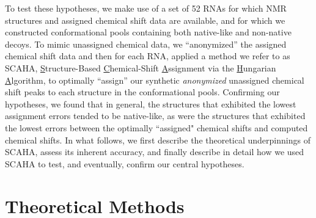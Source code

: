 \documentclass[journal=jcisd8,manuscript=article,layout=onecolumn]{achemso}
\begin{document}
To test these hypotheses, we make use of a set of 52 RNAs for which NMR structures and assigned chemical shift data are available, and for which we constructed conformational pools containing both native-like and non-native decoys. To mimic unassigned chemical data, we ``anonymized'' the assigned chemical shift data and then for each RNA, applied a method we refer to as SCAHA,  \underline{S}tructure-Based \underline{C}hemical-Shift \underline{A}ssignment via the \underline{H}ungarian \underline{A}lgorithm, to optimally ``assign'' our synthetic \textit{anonymized} unassigned chemical shift peaks to each structure in the conformational pools. Confirming our hypotheses, we found that in general,  the structures that exhibited the lowest assignment errors tended to be native-like, as were the structures that exhibited the lowest errors between the optimally ``assigned" chemical shifts and computed chemical shifts. In what follows, we first describe the theoretical underpinnings of SCAHA, assess its inherent accuracy,  and finally describe in detail how we used SCAHA to test, and eventually, confirm our central hypotheses.

\section{Theoretical Methods}
\end{document}
